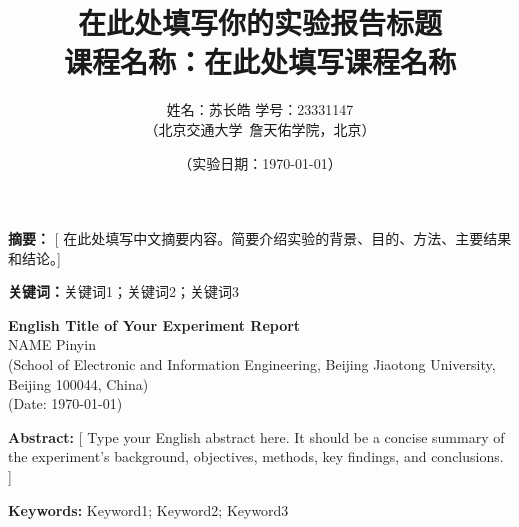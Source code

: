 \documentclass[10pt,twoside]{ctexart}
\title{%
    {\LARGE\bfseries 在此处填写你的实验报告标题}\\[0.5cm]
    {\large 课程名称：在此处填写课程名称}%
}
\author{%
    {\large 姓名：苏长皓 \qquad 学号：23331147}\\[0.2cm]
    {\small （北京交通大学~詹天佑学院，北京）}%
}
\date{{\large （实验日期：\today）}}
\renewenvironment{abstract}{%
  \noindent\textbf{摘\quad 要：}}{\par}
\newcommand{\keywords}[1]{%
  \noindent\textbf{关键词：}#1\par}
\newenvironment{enabstract}{%
  \noindent\textbf{Abstract: }}{\par}
\newcommand{\enkeywords}[1]{%
  \noindent\textbf{Keywords: }#1\par}
\begin{document}
\maketitle
\thispagestyle{fancy}

\begin{abstract}
[ 在此处填写中文摘要内容。简要介绍实验的背景、目的、方法、主要结果和结论。]
\end{abstract}

\keywords{关键词1；关键词2；关键词3}

\vspace{0.5cm}

\begin{center}
{\large\bfseries English Title of Your Experiment Report}\\[0.3cm]
{\normalsize NAME Pinyin}\\[0.2cm]
{\small (School of Electronic and Information Engineering, Beijing Jiaotong University, Beijing 100044, China)}\\[0.2cm]
{\small (Date: \today)}
\end{center}

\begin{enabstract}
[ Type your English abstract here. It should be a concise summary of the experiment's background, objectives, methods, key findings, and conclusions. ]
\end{enabstract}

\enkeywords{Keyword1; Keyword2; Keyword3}

\vspace{0.5cm}
\end{document}
